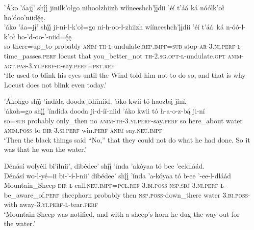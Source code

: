 \ea\label{ex:text4-4-27}
’Áko ’áajį’ shį́į́ jinilk’ołgo nihoolzhiizh wííneeshch’į́įdii ’éí t’áá ká nóólk’oł ho’doo’niidę́ę.\\
\gll ’áko	’áa=jį’	shį́į́	ji-ni-l-k’oł=go	ni-h-oo-l-zhiizh	wííneeshch’į́įdii	’éí	t’áá~{ká}	n-óó-l-k’oł	ho-’d-oo-’-niid=ę́ę\\
     so	there=up\_to	probably	\textsc{anim}-\textsc{th}-\textsc{l}-undulate.\textsc{rep}.\textsc{impf}=\textsc{sub}	stop-\textsc{ar}-3.\textsc{ni}.\textsc{perf}-\textsc{l}-time\_passes.\textsc{perf}	locust	that	you\_better\_not	\textsc{th}-2.\textsc{sg}.\textsc{opt}-\textsc{l}-undulate.\textsc{opt}	\textsc{anim}-\textsc{agt}.\textsc{pas}-3.\textsc{yi}.\textsc{perf}-\textsc{d}-say.\textsc{perf}=\textsc{pst}.\textsc{ref}\\
\glt `He used to blink his eyes until the Wind told him not to do so, and that is why Locust does not blink even today.'
\z

\ea\label{ex:text4-4-28}
’Ákohgo shį́į́ ’índída dooda jidííniid, ’áko kwii tó haozbą́ jiní.\\
\gll ’ákoh=go	shį́į́	’índída	dooda	ji-d-íí-niid	’áko	kwii	tó	h-a-o-z-bą́	ji-ní\\
     so=\textsc{sub}	probably	only\_then	no	\textsc{anim}-\textsc{th}-3.\textsc{yi}.\textsc{perf}-say.\textsc{perf}	so	here\_about	water	\textsc{anim}.\textsc{poss}-to-\textsc{dir}-3.\textsc{si}.\textsc{perf}-win.\textsc{perf}	\textsc{anim}-say.\textsc{neu}.\textsc{impf}\\
\glt `Then the black things said ``No,'' that they could not do what he had done. So it was that he won the water.'
\z

\ea\label{ex:text4-5-1}
Dénásí wolyéii bi’ílnii’, dibédee’ shį́į́ ’índa ’akóyaa tó bee ’eeldláád.\\
\gll Dénásí	wo-l-yé=ii	bi-’-í-l-nii’	dibédee’	shį́į́	’índa	’a-kóyaa	tó	b-ee	’-ee-l-dláád\\
     Mountain\_Sheep	\textsc{dir}-\textsc{l}-call.\textsc{neu}.\textsc{impf}=\textsc{pcl}.\textsc{ref}	3.\textsc{bi}.\textsc{poss}-\textsc{nsp}.\textsc{sbj}-3.\textsc{ni}.\textsc{perf}-\textsc{l}-be\_aware\_of.\textsc{perf}	sheephorn	probably	then	\textsc{nsp}.\textsc{poss}-down\_there	water	3.\textsc{bi}.\textsc{poss}-with	away-3.\textsc{yi}.\textsc{perf}-\textsc{l}-tear.\textsc{perf}\\
\glt `Mountain Sheep was notified, and with a sheep's horn he dug the way out for the water.'
\z

